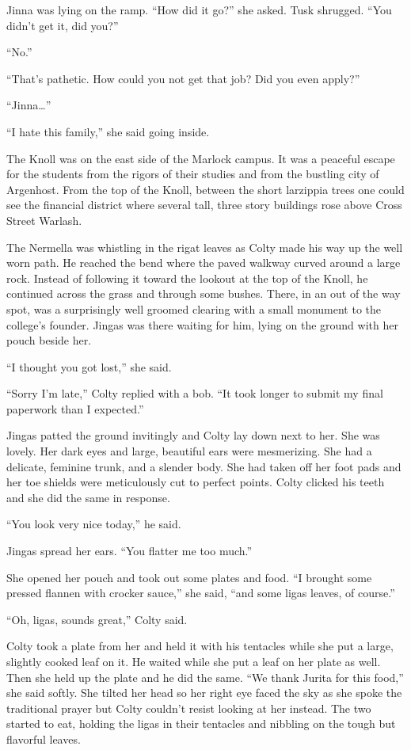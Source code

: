 Jinna was lying on the ramp. ``How did it go?'' she asked. Tusk shrugged. ``You didn't get it,
did you?''

``No.''

``That's pathetic. How could you not get that job? Did you even apply?''

``Jinna\ldots''

``I hate this family,'' she said going inside.

\spacebreak

The Knoll was on the east side of the Marlock campus. It was a peaceful escape for the students
from the rigors of their studies and from the bustling city of Argenhost. From the top of the
Knoll, between the short larzippia trees one could see the financial district where several
tall, three story buildings rose above Cross Street Warlash.

The Nermella was whistling in the rigat leaves as Colty made his way up the well worn path. He
reached the bend where the paved walkway curved around a large rock. Instead of following it
toward the lookout at the top of the Knoll, he continued across the grass and through some
bushes. There, in an out of the way spot, was a surprisingly well groomed clearing with a small
monument to the college's founder. Jingas was there waiting for him, lying on the ground with
her pouch beside her.

``I thought you got lost,'' she said.

``Sorry I'm late,'' Colty replied with a bob. ``It took longer to submit my final paperwork than
I expected.''

Jingas patted the ground invitingly and Colty lay down next to her. She was lovely. Her dark
eyes and large, beautiful ears were mesmerizing. She had a delicate, feminine trunk, and a
slender body. She had taken off her foot pads and her toe shields were meticulously cut to
perfect points. Colty clicked his teeth and she did the same in response.

``You look very nice today,'' he said.

Jingas spread her ears. ``You flatter me too much.''

She opened her pouch and took out some plates and food. ``I brought some pressed flannen with
crocker sauce,'' she said, ``and some ligas leaves, of course.''

``Oh, ligas, sounds great,'' Colty said.

Colty took a plate from her and held it with his tentacles while she put a large, slightly
cooked leaf on it. He waited while she put a leaf on her plate as well. Then she held up the
plate and he did the same. ``We thank Jurita for this food,'' she said softly. She tilted her
head so her right eye faced the sky as she spoke the traditional prayer but Colty couldn't
resist looking at her instead. The two started to eat, holding the ligas in their tentacles and
nibbling on the tough but flavorful leaves.

